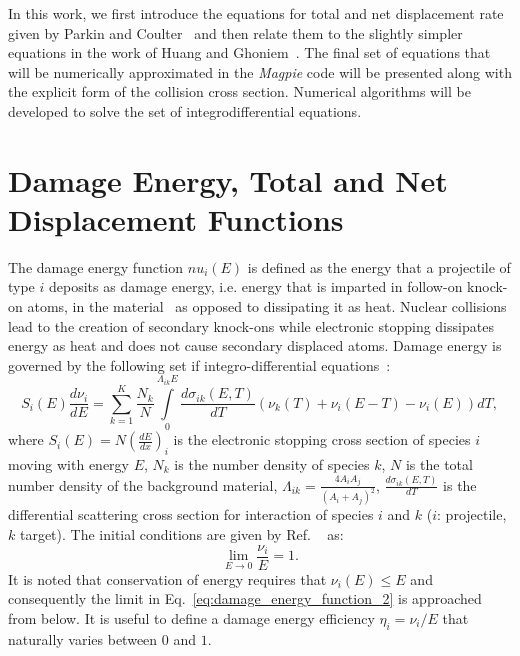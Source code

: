 \documentclass[review]{elsarticle}
\begin{document}
In this work, we first introduce the equations for total and net displacement rate given by Parkin and Coulter~\cite{PC1981} and then 
relate them to the slightly simpler equations in the work of Huang and Ghoniem~\cite{Huang1993}. The final set of equations that will be numerically approximated in the \textit{Magpie} code will be presented along with the explicit form of the collision cross section. Numerical algorithms will be developed to solve the set of integrodifferential equations.

\section{Damage Energy, Total and Net Displacement Functions}
The damage energy function $nu_i(E)$ is defined as the energy that a projectile of type $i$ deposits as damage energy, i.e. energy that is imparted in follow-on knock-on atoms, in the material~\cite{PC1980} as opposed to dissipating it as heat. Nuclear collisions lead to the creation of secondary knock-ons while electronic stopping dissipates energy as heat and does not cause secondary displaced atoms. Damage energy is governed by the following set if integro-differential equations~\cite{PC1980}:
\begin{equation}\label{eq:damage_energy_function_1}
   S_i(E) \frac{d \nu_i}{dE} = \sum\limits_{k=1}^K   \frac{N_k}{N} \int\limits_{0}^{\Lambda_{ik} E}  \frac{d \sigma_{ik} (E,T)}{dT}  
   \left( \nu_k(T) + \nu_i(E-T) - \nu_i(E) \right) dT,
\end{equation}
where $S_i(E) = N \left(\frac{dE}{dx}\right)_i$ is the electronic stopping cross section of species $i$ moving with energy $E$, $N_k$ is the number density of species $k$, $N$ is the total number density of the background material, $\Lambda_{ik} = \frac{4A_i A_j}{(A_i + A_j)^2}$, $\frac{d \sigma_{ik} (E,T)}{dT}$ is the differential scattering cross section for interaction of species $i$ and $k$ ($i$: projectile, $k$ target). The initial conditions are given by Ref. ~\cite{Lindhard1963} as:
\begin{equation}\label{eq:damage_energy_function_2}
   \lim\limits_{E \rightarrow 0} \frac{\nu_i}{E} = 1.
\end{equation}
It is noted that conservation of energy requires that $\nu_i(E) \le E$ and consequently the limit in Eq.~\ref{eq:damage_energy_function_2} is approached from below. It is useful to define a damage energy efficiency $\eta_i = \nu_i / E$ that naturally varies between $0$ and $1$.
\end{document}
